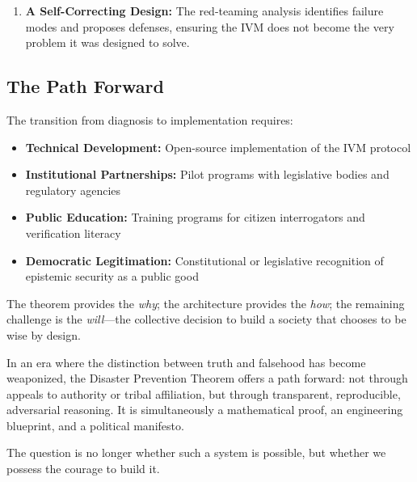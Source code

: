 \documentclass[11pt,a4paper]{article}
\begin{document}
\begin{small}
\begin{enumerate}
    \item \textbf{A Self-Correcting Design:} The red-teaming analysis identifies failure modes and proposes defenses, ensuring the IVM does not become the very problem it was designed to solve.
\end{enumerate}

\subsection{The Path Forward}

The transition from diagnosis to implementation requires:

\begin{itemize}
    \item \textbf{Technical Development:} Open-source implementation of the IVM protocol
    \item \textbf{Institutional Partnerships:} Pilot programs with legislative bodies and regulatory agencies
    \item \textbf{Public Education:} Training programs for citizen interrogators and verification literacy
    \item \textbf{Democratic Legitimation:} Constitutional or legislative recognition of epistemic security as a public good
\end{itemize}

The theorem provides the \textit{why}; the architecture provides the \textit{how}; the remaining challenge is the \textit{will}---the collective decision to build a society that chooses to be wise by design.

In an era where the distinction between truth and falsehood has become weaponized, the Disaster Prevention Theorem offers a path forward: not through appeals to authority or tribal affiliation, but through transparent, reproducible, adversarial reasoning. It is simultaneously a mathematical proof, an engineering blueprint, and a political manifesto.

The question is no longer whether such a system is possible, but whether we possess the courage to build it.





\clearpage %
\appendix




\end{small}
\end{document}
